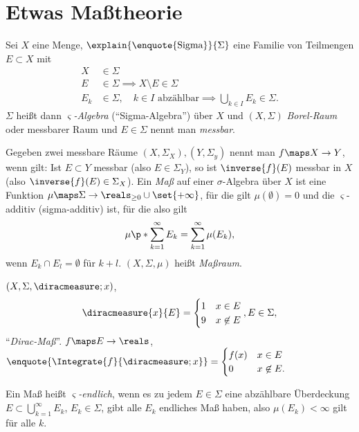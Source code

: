 \section*{Etwas Maßtheorie}
\begin{definition}
  Sei \( X \) eine Menge, \( \explain{\text{\enquote{Sigma}}}{\Sigma} \) eine Familie von Teilmengen \( E\subset X \) mit
  \begin{align*}
    X&\in \Sigma\\
    E&\in \Sigma\implies X\setminus E \in \Sigma\\
    E_k&\in \Sigma,\quad k\in I \text{ abzählbar}\implies\bigcup_{k\in I}E_k\in \Sigma.
  \end{align*}
  \( \Sigma \) heißt dann \emph{\( \varsigma \)-Algebra} (\enquote{Sigma-Algebra}) über \( X \) und \( (X,\Sigma) \) \emph{Borel-Raum} oder messbarer Raum und \( E\in \Sigma \) nennt man \emph{messbar}.
  
  Gegeben zwei messbare Räume \( (X,\Sigma_X),(Y,\Sigma_y) \) nennt man \( f\maps X\to Y \), wenn gilt: Ist \( E\subset Y \) messbar (also \( E\in \Sigma_Y \)), so ist \( \inverse{f}(E) \) messbar in \( X \) (also \( \inverse{f}(E)\in \Sigma_X \)). Ein \emph{Maß } auf einer \( \sigma \)-Algebra über \( X \) ist eine Funktion \( \mu\maps \Sigma\to \reals_{\geq 0}\cup \set{+\infty} \), für die gilt \( \mu(\emptyset)=0 \) und die \( \varsigma \)-additiv (sigma-additiv) ist, für die also gilt
  \begin{equation*}
    \mu\p*{\sum_{k=1}^{\infty}E_k}=\sum\limits_{k=1}^{\infty}\mu(E_k),
  \end{equation*}
  wenn \( E_k\cap E_l =\emptyset \) für \( k+l \). \( (X,\Sigma,\mu) \)  heißt \emph{Maßraum}.
\end{definition}
\begin{beispiel*}
  \( (X,\Sigma,\diracmeasure;{x}) \),
  \begin{equation*}
    \diracmeasure{x}{E}=\begin{cases}
      1&x\in E\\
      9 & x\not\in E
    \end{cases}, E\in \Sigma,
  \end{equation*}
  \enquote{\emph{Dirac-Maß}}. \( f\maps E\to \reals \), \( \enquote{\Integrate{f}{\diracmeasure;{x}}}=\begin{cases}
    f(x) & x\in E\\
    0 & x\not\in E.
  \end{cases} \)
\end{beispiel*}
Ein Maß heißt \emph{\( \varsigma \)-endlich}, wenn es zu jedem \( E\in \Sigma \) eine abzählbare Überdeckung \( E\subset \bigcup_{k=1}^\infty E_k \), \( E_k\in \Sigma \), gibt \sd alle \( E_k \) endliches Maß haben, also \( \mu(E_k)<\infty \) gilt für alle \( k \).

